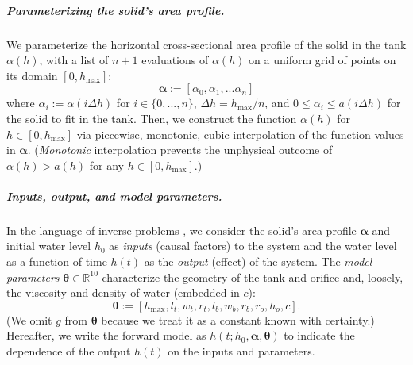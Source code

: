 \documentclass[a4paper,fleqn]{cas-dc}
\newcommand\themodel {$h(t; h_0, \boldsymbol \alpha, \boldsymbol\theta)$\xspace}
\begin{document}
\subparagraph{Parameterizing the solid's area profile.}
We parameterize the horizontal cross-sectional area profile of the solid in the tank $\alpha(h)$, with a list of $n+1$ evaluations of $\alpha(h)$ on a uniform grid of points on its domain $[0, h_{\text{max}}]$:
\begin{equation}
	\boldsymbol \alpha := [\alpha_0, \alpha_1, ... \alpha_n] \label{eq:alpha}
\end{equation}
where $\alpha_i :=\alpha(i \Delta h)$ for $i \in \{0, ..., n\}$, $\Delta h = h_{\text{max}}/n$, and $0 \leq \alpha_i \leq a(i\Delta h)$ for the solid to fit in the tank.
Then, we construct the function $\alpha(h)$ for $h\in [0, h_{\text{max}}]$ via piecewise, monotonic, cubic interpolation \cite{fritsch1984method} of the function values in $\boldsymbol \alpha$. (\emph{Monotonic} interpolation prevents the unphysical outcome of $\alpha(h) > a(h)$ for any $h \in [0, h_{\text{max}}]$.) 


\subparagraph{Inputs, output, and model parameters.} 
In the language of inverse problems \cite{groetsch1999inverse,waqar2023tutorial}, we 
consider the solid's area profile $\boldsymbol \alpha$ and initial water level $h_0$ as \emph{inputs} (causal factors) to the system and the water level as a function of time $h(t)$ as the \emph{output} (effect) of the system.
The \emph{model parameters} $\boldsymbol \theta \in \mathbb{R}^{10}$ characterize the geometry of the tank and orifice and, loosely, the viscosity and density of water (embedded in $c$):
\begin{equation}
	\boldsymbol \theta := [h_{\text{max}}, l_t, w_t, r_t, l_b, w_b, r_b, r_o, h_o, c]. \label{eq:theta}
\end{equation}
(We omit $g$ from $\boldsymbol \theta$ because we treat it as a constant known with certainty.)
Hereafter, we write the forward model as \themodel to indicate the dependence of the output $h(t)$ on the inputs and parameters.
\end{document}
